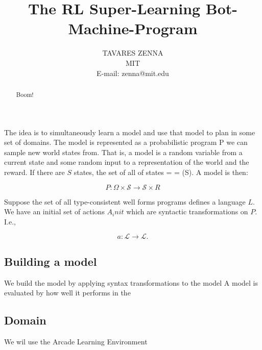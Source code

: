 \documentclass{tlp}
\begin{document}


\title{The RL Super-Learning Bot-Machine-Program}

\author[Z. Tavares, M. Siegel]
{TAVARES ZENNA \\
MIT\\
E-mail: zenna@mit.edu
}


\pagerange{\pageref{firstpage}--\pageref{lastpage}}

\maketitle

\label{firstpage}

\begin{abstract}
%
Boom!

\end{abstract}

The idea is to simultaneously learn a model and use that model to plan in some set of domains.
The model is represented as a probabilistic program P we can sample new world states from.
That is, a model is a random variable from a current state and some random input to a representation of the world and the reward.  If there are $S$ states, the set of all of states =  = (S).  A model is then:

\[
P : \Omega \times \mathcal{S} \to \mathcal{S} \times R
\]

Suppose the set of all type-consistent well forms programs defines a language $L$.
We have an initial set of actions $A_init$ which are syntactic transformations on $P$. I.e.,

\[
a: \mathcal{L} \to \mathcal{L}.
\]

\subsection{Building a model}
We build the model by applying syntax transformations to the model
A model is evaluated by how well it performs in the 


\subsection{Domain}
We wil use the Arcade Learning Environment


\end{document}
